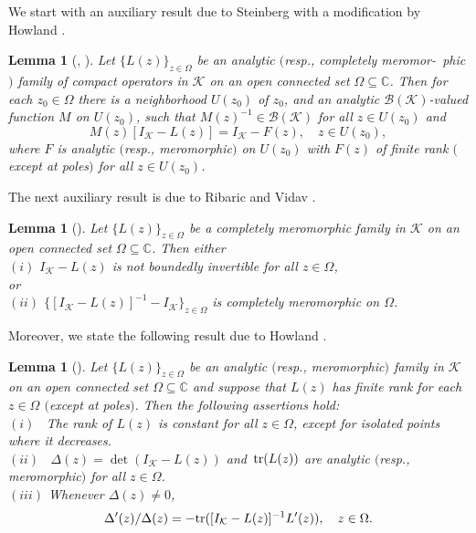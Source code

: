 \documentclass[reqno,10pt, centertags]{amsart}
\newcommand{\bbC}{{\mathbb{C}}}
\newcommand{\cB}{{\mathcal B}}
\newcommand{\cK}{{\mathcal K}}
\newcommand{\lb}{\label}
\newcommand{\tr}{\text{\rm{tr}}}
\numberwithin{equation}{section}
\newtheorem{lemma}[theorem]{Lemma}
\theoremstyle{definition}
\begin{document}
We start with an auxiliary result due to Steinberg
\cite{St68} with a modification by Howland \cite{Ho70}.

\begin{lemma}[\cite{Ho70}, \cite{St68}] \lb{l2.8}
Let $\{L(z)\}_{z\in\Omega}$ be an analytic $($resp., completely
meromor-\ phic$)$ family of compact operators in $\cK$ on an open connected set
$\Omega\subseteq\bbC$. Then for each $z_0\in\Omega$ there is a
neighborhood $U(z_0)$ of $z_0$, and an analytic $\cB(\cK)$-valued function
$M$ on $U(z_0)$, such that $M(z)^{-1}\in \cB(\cK)$ for all $z\in U(z_0)$
and
\begin{equation}
M(z)[I_{\cK}-L(z)]=I_{\cK}-F(z), \quad z\in U(z_0), \lb{2.44}
\end{equation}
where $F$ is analytic $($resp., meromorphic$)$ on $U(z_0)$
with $F(z)$ of finite rank $($except at poles$)$ for all $z\in U(z_0)$.
\end{lemma}

The next auxiliary result is due to Ribaric and Vidav \cite{RV69}.

\begin{lemma}[\cite{RV69}] \lb{l2.9}
Let $\{L(z)\}_{z\in\Omega}$ be a completely meromorphic family in $\cK$ on
an open connected set $\Omega\subseteq\bbC$. Then either \\
$(i)$ $I_{\cK}-L(z)$ is not boundedly invertible for all $z\in\Omega$,
\\
or \\
$(ii)$ $\{[I_{\cK}-L(z)]^{-1}-I_{\cK}\}_{z\in\Omega}$ is completely
meromorphic on $\Omega$.
\end{lemma}

Moreover, we state the following result due to Howland \cite{Ho71}.

\begin{lemma}[\cite{Ho71}] \lb{l2.10}
Let $\{L(z)\}_{z\in\Omega}$ be an analytic $($resp., meromorphic$)$ family
in $\cK$ on an open connected set $\Omega\subseteq\bbC$ and suppose
that $L(z)$ has finite rank for each $z\in\Omega$ $($except at
poles$)$. Then the following assertions hold: \\
$(i)$ \, The rank of $L(z)$ is constant for all $z\in\Omega$, except for
isolated points where it decreases. \\
$(ii)$ \, $\Delta(z)=\det(I_{\cK}-L(z))$ and \,$\tr(L(z))$
are analytic $($resp., meromorphic$)$ for all $z\in\Omega$. \\
$(iii)$ Whenever $\Delta(z)\neq 0$,
\begin{equation}
\Delta'(z)/\Delta(z)=-\tr([I_{\cK}-L(z)]^{-1}L'(z)),
\quad z\in\Omega. \lb{2.44a}
\end{equation}
\end{lemma}
\end{document}
